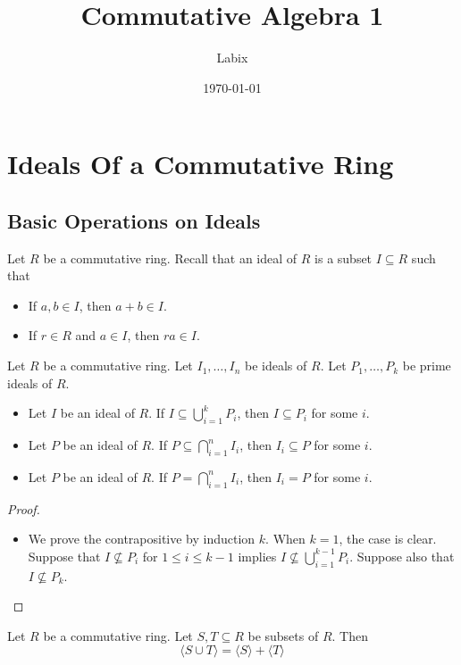 \documentclass[a4paper]{article}
\title{Commutative Algebra 1}
\author{Labix}
\date{\today}
\begin{document}
\maketitle
\begin{abstract}
\end{abstract}
\pagebreak
\tableofcontents

\pagebreak
\section{Ideals Of a Commutative Ring}
\subsection{Basic Operations on Ideals}
Let $R$ be a commutative ring. Recall that an ideal of $R$ is a subset $I\subseteq R$ such that
\begin{itemize}
\item If $a,b\in I$, then $a+b\in I$. 
\item If $r\in R$ and $a\in I$, then $ra\in I$. 
\end{itemize}

\begin{prp}{}{} Let $R$ be a commutative ring. Let $I_1,\dots,I_n$ be ideals of $R$. Let $P_1,\dots,P_k$ be prime ideals of $R$. 
\begin{itemize}
\item Let $I$ be an ideal of $R$. If $I\subseteq\bigcup_{i=1}^kP_i$, then $I\subseteq P_i$ for some $i$. 
\item Let $P$ be an ideal of $R$. If $P\subseteq\bigcap_{i=1}^nI_i$, then $I_i\subseteq P$ for some $i$. 
\item Let $P$ be an ideal of $R$. If $P=\bigcap_{i=1}^nI_i$, then $I_i=P$ for some $i$. 
\end{itemize} \tcbline
\begin{proof}~\\
\begin{itemize}
\item We prove the contrapositive by induction $k$. When $k=1$, the case is clear. Suppose that $I\not\subseteq P_i$ for $1\leq i\leq k-1$ implies $I\not\subseteq\bigcup_{i=1}^{k-1}P_i$. Suppose also that $I\not\subseteq P_k$. 
\end{itemize}
\end{proof}
\end{prp}

\begin{prp}{}{} Let $R$ be a commutative ring. Let $S,T\subseteq R$ be subsets of $R$. Then $$\langle S\cup T\rangle=\langle S\rangle +\langle T\rangle$$
\end{prp}
\end{document}
